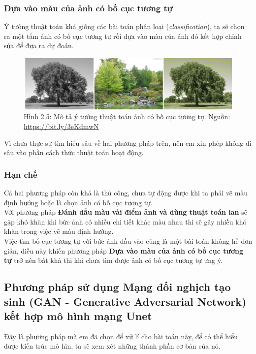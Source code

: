 \documentclass[a4paper]{article}
\begin{document}
\subsubsection{Dựa vào màu của ảnh có bố cục tương tự}
Ý tưởng thuật toán khá giống các bài toán phân loại (\textit{classification}), ta sẽ chọn ra một tấm ảnh có bố cục tương tự rồi dựa vào màu của ảnh đó kết hợp chỉnh sửa để đưa ra dự đoán.

\begin{figure}[h!]
\centering
\includegraphics[width=15cm]{images/2_5.png}
\caption{Hình 2.5: Mô tả ý tưởng thuật toán ảnh có bố cục tương tự. Nguồn: \href{https://bit.ly/3eKdmwN}{https://bit.ly/3eKdmwN}}
\end{figure}

\noindent
Vì chưa thực sự tìm hiểu sâu về hai phương pháp trên, nên em xin phép không đi sâu vào phần cách thức thuật toán hoạt động.

\subsubsection{Hạn chế}
Cả hai phương pháp còn khá là thủ công, chưa tự động được khi ta phải vẽ màu định hướng hoặc là chọn ảnh có bố cục tương tự.\\
Với phương pháp \textbf{Đánh dấu màu vài điểm ảnh và dùng thuật toán lan} sẽ gặp khó khăn khi bức ảnh có nhiều chi tiết khác màu nhau thì sẽ gây nhiều khó khăn trong việc vẽ màu định hướng.\\
Việc tìm bố cục tương tự với bức ảnh đầu vào cũng là một bài toán không hề đơn giản, điều này khiến phương pháp \textbf{Dựa vào màu của ảnh có bố cục tương tự} trở nên bất khả thi khi chưa tìm được ảnh có bố cục tương tự ưng ý.

\subsection{Phương pháp sử dụng Mạng đối nghịch tạo sinh (GAN - Generative Adversarial Network) kết hợp mô hình mạng Unet}

Đây là phương pháp mà em đã chọn để xử lí cho bài toán này, để có thể hiểu được kiến trúc mô hìn, ta sẽ xem xét những thành phần cơ bản của nó.
\end{document}
